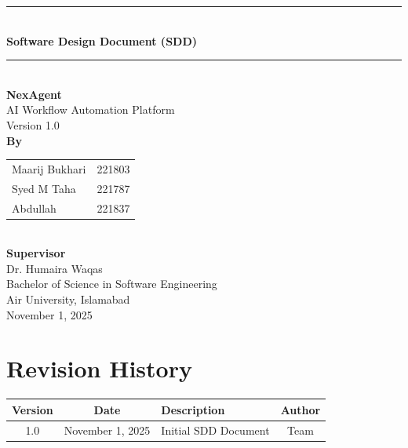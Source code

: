 \documentclass[12pt,a4paper]{article}
\begin{document}
\begin{titlepage}
    \centering
    \vspace*{1cm}
    
    \rule{\linewidth}{0.5mm} \\[0.4cm]
    {\huge\bfseries Software Design Document (SDD)}\\[0.4cm]
    \rule{\linewidth}{0.5mm} \\[1.5cm]
    
    {\Large\bfseries NexAgent}\\[0.5cm]
    {\large AI Workflow Automation Platform}\\[2cm]
    
    {\Large Version 1.0}\\[2cm]
    
    {\large\bfseries By}\\[0.5cm]
    {\large
    \begin{tabular}{ll}
        Maarij Bukhari & 221803\\
        Syed M Taha & 221787\\
        Abdullah & 221837\\
    \end{tabular}
    }\\[2cm]
    
    {\large\bfseries Supervisor}\\[0.5cm]
    {\large Dr. Humaira Waqas}\\[2cm]
    
    {\large Bachelor of Science in Software Engineering}\\[0.5cm]
    {\large Air University, Islamabad}\\[1cm]
    
    {\large November 1, 2025}
    
    \vfill
\end{titlepage}

\tableofcontents
\newpage

\section*{Revision History}

\begin{table}[h]
\centering
\begin{tabularx}{\textwidth}{|c|c|X|c|}
\hline
\textbf{Version} & \textbf{Date} & \textbf{Description} & \textbf{Author}\\
\hline
1.0 & November 1, 2025 & Initial SDD Document & Team\\
\hline
\end{tabularx}
\end{table}
\end{document}
